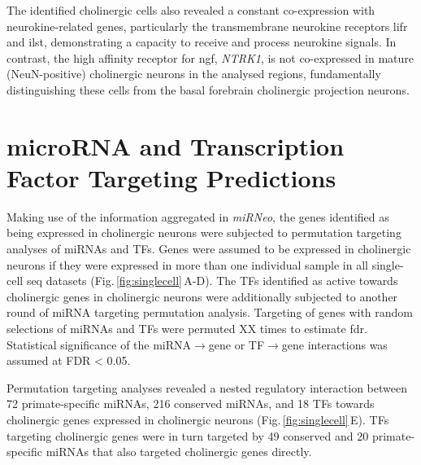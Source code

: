 The identified cholinergic cells also revealed a constant co-expression with neurokine-related genes, particularly the transmembrane neurokine receptors \ac{lifr} and \ac{ilst}, demonstrating a capacity to receive and process neurokine signals. In contrast, the high affinity receptor for \ac{ngf}, \textit{NTRK1}, is not co-expressed in mature (NeuN-positive) cholinergic neurons in the analysed regions, fundamentally distinguishing these cells from the basal forebrain cholinergic projection neurons.

\section{microRNA and Transcription Factor Targeting Predictions}
\begin{method}
Making use of the information aggregated in \emph{miRNeo}, the genes identified as being expressed in cholinergic neurons were subjected to permutation targeting analyses of miRNAs and TFs. Genes were assumed to be expressed in cholinergic neurons if they were expressed in more than one individual sample in all single-cell \ac{seq} datasets (Fig.\,\ref{fig:singlecell}\,A-D). The TFs identified as active towards cholinergic genes in cholinergic neurons were additionally subjected to another round of miRNA targeting permutation analysis. Targeting of genes with random selections of miRNAs and TFs were permuted XX times to estimate \ac{fdr}. Statistical significance of the miRNA$\to$gene or TF$\to$gene interactions was assumed at FDR < 0.05.
\end{method}

Permutation targeting analyses revealed a nested regulatory interaction between 72 primate-specific miRNAs, 216 conserved miRNAs, and 18 TFs towards cholinergic genes expressed in cholinergic neurons (Fig.\,\ref{fig:singlecell}\,E). TFs targeting cholinergic genes were in turn targeted by 49 conserved and 20 primate-specific miRNAs that also targeted cholinergic genes directly.

